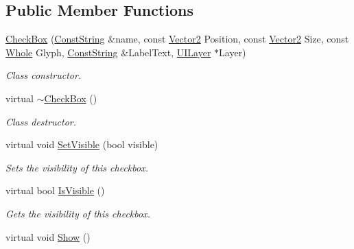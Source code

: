 \subsection*{Public Member Functions}
\begin{DoxyCompactItemize}
\item 
\hyperlink{classphys_1_1UI_1_1CheckBox_aa6952188a51cb452f2a34c5c2cc134ff}{CheckBox} (\hyperlink{namespacephys_a5ce5049f8b4bf88d6413c47b504ebb31}{ConstString} \&name, const \hyperlink{classphys_1_1Vector2}{Vector2} Position, const \hyperlink{classphys_1_1Vector2}{Vector2} Size, const \hyperlink{namespacephys_a460f6bc24c8dd347b05e0366ae34f34a}{Whole} Glyph, \hyperlink{namespacephys_a5ce5049f8b4bf88d6413c47b504ebb31}{ConstString} \&LabelText, \hyperlink{classphys_1_1UILayer}{UILayer} $\ast$Layer)
\begin{DoxyCompactList}\small\item\em Class constructor. \item\end{DoxyCompactList}\item 
\hypertarget{classphys_1_1UI_1_1CheckBox_a60c4d62c357a7158d69888a367b5dc56}{
virtual \hyperlink{classphys_1_1UI_1_1CheckBox_a60c4d62c357a7158d69888a367b5dc56}{$\sim$CheckBox} ()}
\label{dd/d10/classphys_1_1UI_1_1CheckBox_a60c4d62c357a7158d69888a367b5dc56}

\begin{DoxyCompactList}\small\item\em Class destructor. \item\end{DoxyCompactList}\item 
virtual void \hyperlink{classphys_1_1UI_1_1CheckBox_aac2babdb951a7b716b5cfff9b925420f}{SetVisible} (bool visible)
\begin{DoxyCompactList}\small\item\em Sets the visibility of this checkbox. \item\end{DoxyCompactList}\item 
virtual bool \hyperlink{classphys_1_1UI_1_1CheckBox_a8a2be0cba227f0921071fb14de24f76d}{IsVisible} ()
\begin{DoxyCompactList}\small\item\em Gets the visibility of this checkbox. \item\end{DoxyCompactList}\item 
\hypertarget{classphys_1_1UI_1_1CheckBox_afceb8a1afac295be23227462e6cbc369}{
virtual void \hyperlink{classphys_1_1UI_1_1CheckBox_afceb8a1afac295be23227462e6cbc369}{Show} ()}
\label{dd/d10/classphys_1_1UI_1_1CheckBox_afceb8a1afac295be23227462e6cbc369}


\end{DoxyCompactItemize}
